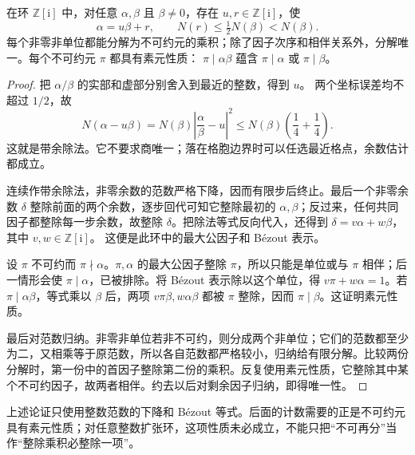 \begin{lemma}\label{b3:lem:24-gaussian-factorization}
在环 \(\mathbb Z[\mathrm{i}]\) 中，对任意 \(\alpha,\beta\) 且 \(\beta\ne0\)，存在 \(u,r\in\mathbb Z[\mathrm{i}]\)，使
\[
\alpha=u\beta+r,\qquad N(r)\le\tfrac12N(\beta)<N(\beta).
\]
每个非零非单位都能分解为不可约元的乘积；除了因子次序和相伴关系外，分解唯一。每个不可约元 \(\pi\) 都具有素元性质：
\(\pi\mid\alpha\beta\) 蕴含 \(\pi\mid\alpha\) 或 \(\pi\mid\beta\)。
\end{lemma}
\begin{proof}
把 \(\alpha/\beta\) 的实部和虚部分别舍入到最近的整数，得到 \(u\)。
两个坐标误差均不超过 \(1/2\)，故
\[
N(\alpha-u\beta)=N(\beta)\left|\frac{\alpha}{\beta}-u\right|^2
\le N(\beta)\left(\frac14+\frac14\right).
\]
这就是带余除法。它不要求商唯一；落在格胞边界时可以任选最近格点，余数估计都成立。

连续作带余除法，非零余数的范数严格下降，因而有限步后终止。最后一个非零余数 \(\delta\) 整除前面的两个余数，逐步回代可知它整除最初的 \(\alpha,\beta\)；反过来，任何共同因子都整除每一步余数，故整除 \(\delta\)。把除法等式反向代入，还得到
\(\delta=v\alpha+w\beta\)，其中 \(v,w\in\mathbb Z[\mathrm{i}]\)。
这便是此环中的最大公因子和 Bézout 表示。

设 \(\pi\) 不可约而 \(\pi\nmid\alpha\)。\(\pi,\alpha\) 的最大公因子整除 \(\pi\)，所以只能是单位或与 \(\pi\) 相伴；后一情形会使 \(\pi\mid\alpha\)，已被排除。将 Bézout 表示除以这个单位，得
\(v\pi+w\alpha=1\)。若 \(\pi\mid\alpha\beta\)，等式乘以 \(\beta\) 后，两项 \(v\pi\beta,w\alpha\beta\) 都被 \(\pi\) 整除，因而 \(\pi\mid\beta\)。这证明素元性质。

最后对范数归纳。非零非单位若非不可约，则分成两个非单位；它们的范数都至少为二，又相乘等于原范数，所以各自范数都严格较小，归纳给有限分解。比较两份分解时，第一份中的首因子整除第二份的乘积。反复使用素元性质，它整除其中某个不可约因子，故两者相伴。约去以后对剩余因子归纳，即得唯一性。
\end{proof}

上述论证只使用整数范数的下降和 Bézout 等式。后面的计数需要的正是不可约元具有素元性质；对任意整数扩张环，这项性质未必成立，不能只把“不可再分”当作“整除乘积必整除一项”。

